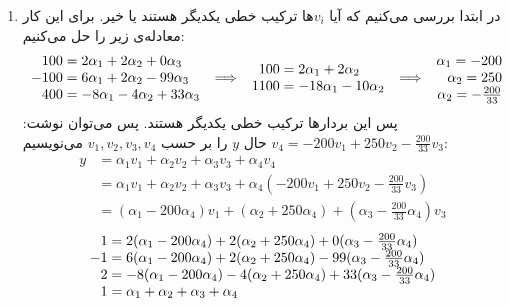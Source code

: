 \begin{enumerate}[wide, labelwidth=!, labelindent=0pt]
\begin{figure}[H]
\end{figure}
    \item در ابتدا بررسی می‌کنیم که آیا
$v_i$ها
ترکیب خطی یکدیگر هستند یا خیر. برای این کار معادله‌ی زیر را حل می‌کنیم:
\begin{align*}
    \begin{array}{r@{\mskip\thickmuskip}l}
		100 &= 2\alpha_1 + 2\alpha_2 + 0\alpha_3\\
		-100 &= 6\alpha_1 + 2\alpha_2 -99\alpha_3\\
		400 &= -8\alpha_1 -4\alpha_2 + 33\alpha_3
    \end{array}
    \implies
    \begin{array}{r@{\mskip\thickmuskip}l}
        100 &= 2\alpha_1 + 2\alpha_2\\
        1100 &= -18\alpha_1 - 10\alpha_2
    \end{array}
    \implies
    \begin{array}{r@{\mskip\thickmuskip}l}
        \alpha_1 = -200\\
        \alpha_2 = 250\\
        \alpha_2 = -\frac{200}{33}\\
    \end{array}
\end{align*}
پس این بردار‌ها ترکیب خطی یکدیگر هستند. پس می‌توان نوشت:
$v_4 = -200v_1 + 250v_2 -\frac{200}{33}v_3$
حال
$y$
را بر حسب
$v_1, v_2, v_3, v_4$
می‌نویسیم:
\begin{align*}
y &= \alpha_1 v_1 + \alpha_2 v_2 + \alpha_3 v_3 + \alpha_4 v_4\\
&= \alpha_1 v_1 + \alpha_2 v_2 + \alpha_3 v_3 + \alpha_4 ( -200v_1 + 250v_2 -\frac{200}{33}v_3 )\\
&= (\alpha_1 - 200\alpha_4) v_1 + (\alpha_2 + 250\alpha_4) + (\alpha_3 - \frac{200}{33}\alpha_4) v_3
\end{align*}
\begin{align*}
    \begin{array}{r@{\mskip\thickmuskip}l}
		1 &= 2(\alpha_1 - 200\alpha_4) + 2(\alpha_2 + 250\alpha_4) + 0(\alpha_3 - \frac{200}{33}\alpha_4)\\
		-1 &= 6(\alpha_1 - 200\alpha_4) + 2(\alpha_2 + 250\alpha_4) -99(\alpha_3 - \frac{200}{33}\alpha_4)\\
		2 &= -8(\alpha_1 - 200\alpha_4) -4(\alpha_2 + 250\alpha_4) + 33(\alpha_3 - \frac{200}{33}\alpha_4)\\
        1 &= \alpha_1 + \alpha_2 + \alpha_3 + \alpha_4
    \end{array}
\end{align*}

\end{enumerate}
